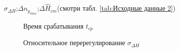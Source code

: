 \documentclass[a4paper,12pt]{article}
\begin{document}
\begin{enumerate}
    $\hat{\sigma}_{\Delta H}$;$\Delta n_{y_{max}}$;$\Delta \hat{H}_{cm}$(смотри табл. \ref{tab:Исходные данные 2})
    
    \begin{figure}[H]     %
        \caption{Время срабатывания $t_{cp}$}
        \label{fig:Время срабатывания}
    \end{figure}
    
    \begin{figure}[H]
        \caption{Относительное перерегулирование $\sigma_{\Delta H}$}
        \label{fig:Относительное перерегулирование}
    \end{figure}
    

\end{enumerate}
\end{document}

